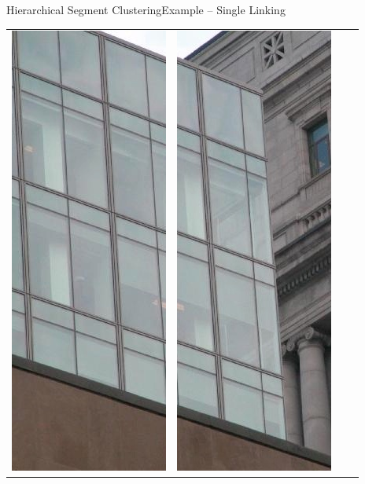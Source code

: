 \documentclass[handout,10pt]{beamer}  %
\begin{document}
\begin{frame}{Hierarchical Segment Clustering}{Example -- Single Linking}
  {\small 
  \begin{center}
  \setlength{\tabcolsep}{0pt}
	  \begin{tabular}{>{\centering\arraybackslash}b{} >{\centering\arraybackslash}b{}>{\centering\arraybackslash}b{}>{\centering\arraybackslash}b{}}
		    \includegraphics[scale=0.25]{./images/clustering/mcgill_20_segment_1.jpg}
		    & \includegraphics[scale=0.25]{./images/clustering/mcgill_20_segment_2.jpg}

\end{tabular}
\end{center}}
\end{frame}
\end{document}
